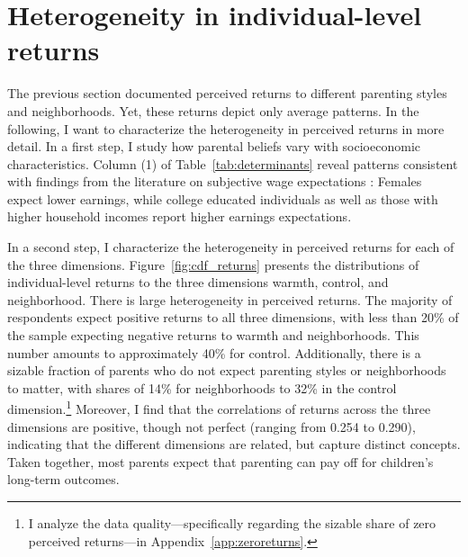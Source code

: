 \documentclass[12pt, a4paper, english]{article}
\begin{document}
\section{Heterogeneity in individual-level returns}\label{sec:determinants}
The previous section documented perceived returns to different parenting styles and neighborhoods. Yet, these returns depict only average patterns. In the following, I want to characterize the heterogeneity in perceived returns in more detail. In a first step, I study how parental beliefs vary with socioeconomic characteristics. Column (1) of Table~\ref{tab:determinants} reveal patterns consistent with findings from the literature on subjective wage expectations \citep[e.g.,][]{Kaufmann2014}: Females expect lower earnings, while college educated individuals as well as those with higher household incomes report higher earnings expectations.

\begin{table}[h!]\centering
    \caption{Determinants of individual-level perceived returns}\label{tab:determinants}
    \resizebox{0.75\textwidth}{!}{
         
    }
    \vspace{0.5em}
    \caption*{\footnotesize \textbf{Notes:} This table presents regressions of parental beliefs about children's expected log-earnings in column (1) or individual-level perceived returns to warmth ($R_{\text{warmth},i}$; columns 1 and 4), control ($R_{\text{control},i}$; columns 2 and 5), as well as neighborhood ($R_{\text{neighb.},i}$; columns 3 and 6) on sociodemographic characteristics according to equation~\eqref{eq:determinants}. Individual-level perceived returns are estimated based on equation~\eqref{eq:main} for each individual separately. Clustered standard errors by respondent in column (1) and robust standard errors in columns (2)-(4) in parentheses. *, **, and *** denote significance at the 10, 5, and 1 percent level.}
\end{table}

In a second step, I characterize the heterogeneity in perceived returns for each of the three dimensions.
Figure~\ref{fig:cdf_returns} presents the distributions of individual-level returns to the three dimensions warmth, control, and neighborhood. There is large heterogeneity in perceived returns. The majority of respondents expect positive returns to all three dimensions, with less than 20\% of the sample expecting negative returns to warmth and neighborhoods. This number amounts to approximately 40\% for control. Additionally, there is a sizable fraction of parents who do not expect parenting styles or neighborhoods to matter, with shares of 14\% for neighborhoods to 32\% in the control dimension.\footnote{I analyze the data quality---specifically regarding the sizable share of zero perceived returns---in Appendix~\ref{app:zeroreturns}.} Moreover, I find that the correlations of returns across the three dimensions are positive, though not perfect (ranging from 0.254 to 0.290), indicating that the different dimensions are related, but capture distinct concepts. Taken together, most parents expect that parenting can pay off for children's long-term outcomes.
\end{document}
